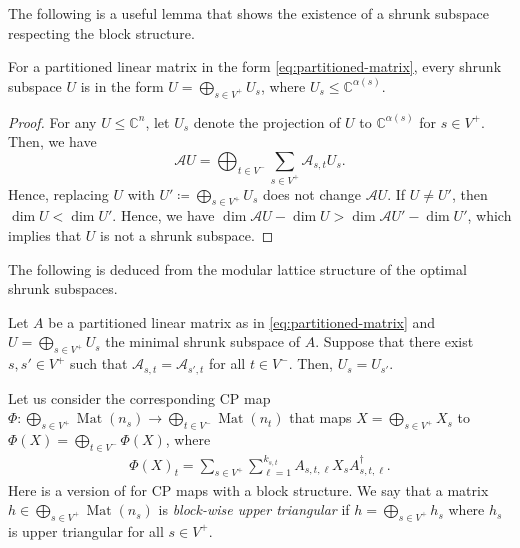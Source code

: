 \documentclass[a4paper,11pt]{article}
\numberwithin{equation}{section}
\newcommand{\C}{\mathbb{C}}
\newcommand{\caA}{\mathcal{A}}
\DeclareMathOperator{\Mat}{Mat}
\begin{document}
The following is a useful lemma that shows the existence of a shrunk subspace respecting the block structure.

\begin{lemma}\label{lem:partitoned-shrunk}
    For a partitioned linear matrix in the form \eqref{eq:partitioned-matrix},
    every shrunk subspace $U$ is in the form $U = \bigoplus_{s \in V^+} U_s$, where $U_s \leq \C^{\alpha(s)}$.
\end{lemma}
\begin{proof}
    For any $U \leq \C^n$, let $U_s$ denote the projection of $U$ to $\C^{\alpha(s)}$ for $s \in V^+$.
    Then, we have
    \[
        \caA U = \bigoplus_{t \in V^-} \sum_{s \in V^+} \caA_{s,t}U_s.
    \]
    Hence, replacing $U$ with $U' \coloneqq \bigoplus_{s \in V^+} U_s$ does not change $\caA U$.
    If $U \neq U'$, then $\dim U < \dim U'$.
    Hence, we have $\dim\caA U - \dim U > \dim\caA U' - \dim U'$,
    which implies that $U$ is not a shrunk subspace.
\end{proof}

The following is deduced from the modular lattice structure of the optimal shrunk subspaces.

\begin{lemma}\label{lem:partitoned-shrunk-rep}
    Let $A$ be a partitioned linear matrix as in \eqref{eq:partitioned-matrix} and $U = \bigoplus_{s \in V^+} U_s$ the minimal shrunk subspace of $A$.
    Suppose that there exist $s, s' \in V^+$ such that $\caA_{s,t} = \caA_{s',t}$ for all $t \in V^-$.
    Then, $U_s = U_{s'}$.
\end{lemma}

Let us consider the corresponding CP map $\Phi: \bigoplus_{s \in V^+}\Mat(n_s) \to \bigoplus_{t \in V^-} \Mat(n_t)$ that maps $X = \bigoplus_{s \in V^+} X_s$ to $\Phi(X) = \bigoplus_{t \in V^-}\Phi(X)$, where
\begin{align}\label{eq:block-CP}
    \Phi(X)_t = \sum_{s \in V^+}\sum_{\ell = 1}^{k_{s,t}} A_{s,t,\ell} X_s A_{s,t,\ell}^\dagger.
\end{align}
Here is a version of  for CP maps with a block structure.
We say that a matrix $h \in \bigoplus_{s \in V^+} \Mat(n_s)$ is \emph{block-wise upper triangular} if $h = \bigoplus_{s \in V^+} h_s$ where $h_s$ is upper triangular for all $s \in V^+$.
\end{document}
